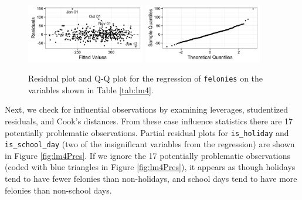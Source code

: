 \documentclass[11pt,notitlepage]{article}
\begin{document}
\begin{figure}[!h]
  \vspace*{-3mm}
  \centering
  \captionsetup{width=0.9\textwidth}
  \subfloat%
  		{\includegraphics[width=0.46\textwidth]
  		{figures/lm4Residuals.png}\label{fig:lm4Residuals}}
  \hfill
  \subfloat%
  		{\includegraphics[width=0.46\textwidth]
  		{figures/lm4QQ.png}\label{fig:lm4QQ}}
  \vspace*{-3mm}
  \caption{Residual plot and Q-Q plot for the regression of \texttt{felonies} on the variables shown in Table \ref{tab:lm4}.}
  \label{fig:lm4ResidualsQQ}
  \vspace*{-3mm}
\end{figure}

Next, we check for influential observations by examining leverages, studentized residuals, and Cook's distances. From these case influence statistics there are 17 potentially problematic observations. Partial residual plots for \texttt{is_holiday} and \texttt{is_school_day} (two of the insignificant variables from the regression) are shown in Figure \ref{fig:lm4Pres}. If we ignore the 17 potentially problematic observations (coded with blue triangles in Figure \ref{fig:lm4Pres}), it appears as though holidays tend to have fewer felonies than non-holidays, and school days tend to have more felonies than non-school days.
\end{document}
